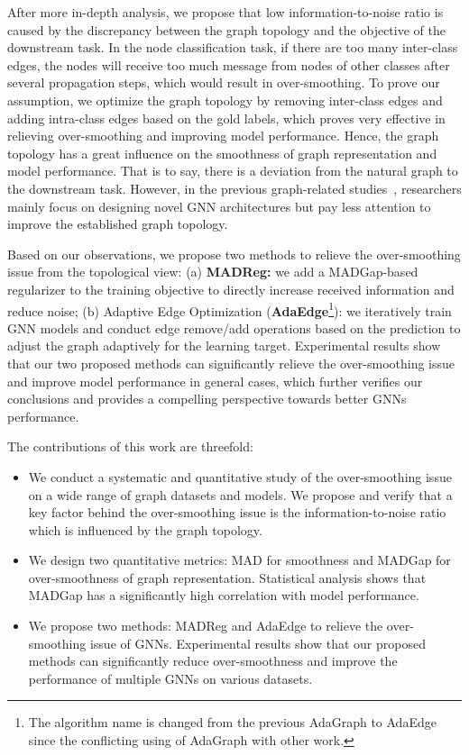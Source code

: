 \documentclass[letterpaper]{article} \usepackage{aaai20}  \usepackage{times}  \usepackage{helvet} \usepackage{courier}  \usepackage[hyphens]{url}  \usepackage{graphicx} \urlstyle{rm} \def\UrlFont{\rm}  \frenchspacing  \setlength{\pdfpagewidth}{8.5in}  \setlength{\pdfpageheight}{11in}  \setcounter{secnumdepth}{0}
\newcommand{\citep}{\cite}
\begin{document}
After more in-depth analysis, we propose that low information-to-noise ratio is caused by the discrepancy between the graph topology and the objective of the downstream task. In the node classification task, if there are too many inter-class edges, the nodes will receive too much message from nodes of other classes after several propagation steps, which would result in over-smoothing. To prove our assumption, we optimize the graph topology by removing inter-class edges and adding intra-class edges based on the gold labels, which proves very effective in relieving over-smoothing and improving model performance. 
Hence, the graph topology has a great influence on the smoothness of graph representation and model performance. That is to say, there is a deviation from the natural graph to the downstream task. However, in the previous graph-related studies~\citep{model_gat,model_ggnn,model_arma}, researchers mainly focus on designing novel GNN architectures but pay less attention to improve the established graph topology.

Based on our observations, we propose two methods to relieve the over-smoothing issue from the topological view: (a) \textbf{MADReg:} we add a MADGap-based regularizer to the training objective to directly increase received information and reduce noise; (b) Adaptive Edge Optimization (\textbf{AdaEdge}\footnote{The algorithm name is changed from the previous AdaGraph to AdaEdge since the conflicting using of AdaGraph with other work.}): we iteratively train GNN models and conduct edge remove/add operations based on the prediction to adjust the graph adaptively for the learning target. Experimental results show that our two proposed methods can significantly relieve the over-smoothing issue and improve model performance in general cases, which further verifies our conclusions and provides a compelling perspective towards better GNNs performance.

The contributions of this work are threefold:
\begin{itemize}
    \item We conduct a systematic and quantitative study of the over-smoothing issue on a wide range of graph datasets and models. We propose and verify that a key factor behind the over-smoothing issue is the information-to-noise ratio which is influenced by the graph topology.
\item We design two quantitative metrics: MAD for smoothness and MADGap for over-smoothness of graph representation.  Statistical analysis shows that MADGap has a significantly high correlation with model performance. 
    \item We propose two methods: MADReg and AdaEdge to relieve the over-smoothing issue of GNNs. Experimental results show that our proposed methods can significantly reduce over-smoothness and improve the performance of multiple GNNs on various datasets.
\end{itemize}
\end{document}
